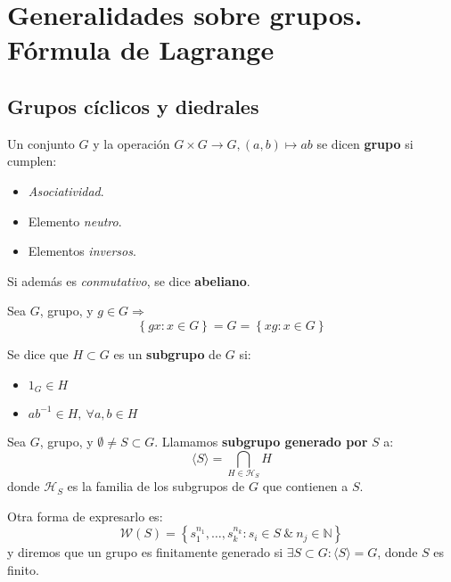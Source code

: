 \chapter{Generalidades sobre grupos.\texorpdfstring{\\}{} Fórmula de Lagrange}
\section{Grupos cíclicos y diedrales}
    \begin{defi}[Grupo]
        Un conjunto $G$ y la operación $G \times G \rightarrow G, \left( a, b \right) \mapsto ab$ se dicen \textbf{grupo} si cumplen:
        \begin{itemize}
            \item \textit{Asociatividad}.
            \item Elemento \textit{neutro}.
            \item Elementos \textit{inversos}.
        \end{itemize}
        Si además es \textit{conmutativo}, se dice \textbf{abeliano}.
    \end{defi}

    \begin{prop}
        Sea $G$, grupo, y $g \in G \Rightarrow$
        \[
        \left\{ gx: x \in G \right\} = G = \left\{ xg : x \in G \right\}
        \]
    \end{prop}

    \begin{defi}[Subgrupo]
        Se dice que $H \subset G$ es un \textbf{subgrupo} de $G$ si:
        \begin{itemize}
            \item $1_G \in H$
            \item $a b^{-1} \in H,\ \forall a, b \in H$
        \end{itemize}
        \end{defi}

        \begin{defi}
        Sea $G$, grupo, y $\emptyset \neq S \subset G$. Llamamos \textbf{subgrupo generado por} $S$ a:
        \[
        \langle S \rangle = \bigcap_{H \in \mathcal{H}_S} H
        \]
        donde $\mathcal{H}_S$ es la familia de los subgrupos de $G$ que contienen a $S$.

        Otra forma de expresarlo es:
        \[
            \mathcal{W}\left( S \right) = \left\{ s_1^{n_1}, \ldots, s_k^{n_k} : s_i \in S\ \&\ n_j \in \mathbb{N} \right\}
        \]
        y diremos que un grupo es finitamente generado si $\exists S \subset G: \langle S \rangle = G$, donde $S$ es finito.
        \end{defi}


